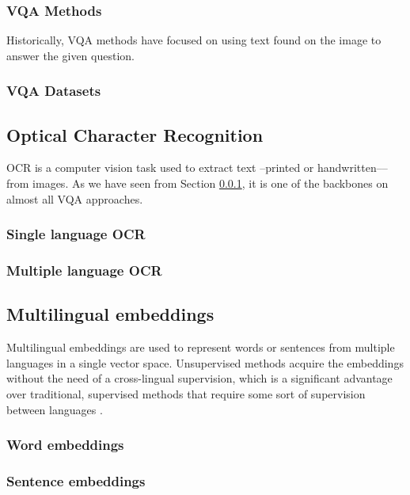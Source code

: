\subsubsection{VQA Methods} 
\label{sota_vqa_methods}

Historically, VQA methods have focused on using text found on the image to answer the given question. 


\subsubsection{VQA Datasets}
\label{sota_vqa_datasets}

\subsection{Optical Character Recognition}
\label{sota_ocr}

OCR is a computer vision task used to extract text –printed or handwritten–– from images. As we have seen from Section \ref{sota_vqa_methods}, it is one of the backbones on almost all VQA approaches.

\subsubsection{Single language OCR}
\label{sota_ocr_single_language}
\subsubsection{Multiple language OCR}
\label{sota_ocr_multiple_language}

\subsection{Multilingual embeddings}
\label{sota_embeddings}
Multilingual embeddings are used to represent words or sentences from multiple languages in a single vector space.  Unsupervised methods acquire the embeddings without the need of a cross-lingual supervision, which is a significant advantage over traditional, supervised methods that require some sort of supervision between languages \cite{chen2018unsupervised}.

\subsubsection{Word embeddings}
\label{sota_word_embeddings}
\subsubsection{Sentence embeddings}
\label{sota_sentence_embeddings}


